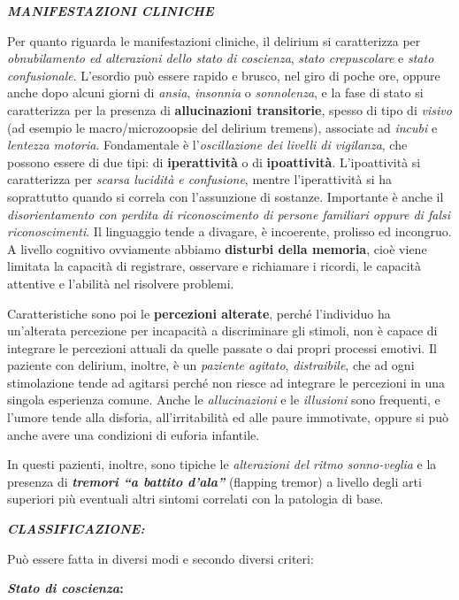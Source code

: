 \documentclass[]{article}
\begin{document}
\textbf{\emph{MANIFESTAZIONI CLINICHE}}

Per quanto riguarda le manifestazioni cliniche, il delirium si
caratterizza per \emph{obnubilamento ed alterazioni dello stato di
coscienza}, \emph{stato crepuscolare} e \emph{stato confusionale}.
L'esordio può essere rapido e brusco, nel giro di poche ore, oppure
anche dopo alcuni giorni di \emph{ansia}, \emph{insonnia} o
\emph{sonnolenza}, e la fase di stato si caratterizza per la presenza di
\textbf{allucinazioni transitorie}, spesso di tipo di \emph{visivo} (ad
esempio le macro/microzoopsie del delirium tremens), associate ad
\emph{incubi} e \emph{lentezza motoria}. Fondamentale è
l'\emph{oscillazione dei livelli di vigilanza}, che possono essere di
due tipi: di \textbf{iperattività} o di \textbf{ipoattività}.
L'ipoattività si caratterizza per \emph{scarsa lucidità e confusione},
mentre l'iperattività si ha soprattutto quando si correla con
l'assunzione di sostanze. Importante è anche il \emph{disorientamento
con perdita di riconoscimento di persone familiari oppure di falsi
riconoscimenti}. Il linguaggio tende a divagare, è incoerente, prolisso
ed incongruo. A livello cognitivo ovviamente abbiamo \textbf{disturbi
della memoria}, cioè viene limitata la capacità di registrare, osservare
e richiamare i ricordi, le capacità attentive e l'abilità nel risolvere
problemi.

Caratteristiche sono poi le \textbf{percezioni alterate}, perché
l'individuo ha un'alterata percezione per incapacità a discriminare gli
stimoli, non è capace di integrare le percezioni attuali da quelle
passate o dai propri processi emotivi. Il paziente con delirium,
inoltre, è un \emph{paziente agitato}, \emph{distraibile}, che ad ogni
stimolazione tende ad agitarsi perché non riesce ad integrare le
percezioni in una singola esperienza comune. Anche le
\emph{allucinazioni} e le \emph{illusioni} sono frequenti, e l'umore
tende alla disforia, all'irritabilità ed alle paure immotivate, oppure
si può anche avere una condizioni di euforia infantile.

In questi pazienti, inoltre, sono tipiche le \emph{alterazioni del ritmo
sonno-veglia} e la presenza di \textbf{\emph{tremori ``a battito
d'ala''}} (flapping tremor) a livello degli arti superiori più eventuali
altri sintomi correlati con la patologia di base.

\textbf{\emph{CLASSIFICAZIONE:}}

Può essere fatta in diversi modi e secondo diversi criteri:

\textbf{\emph{Stato di coscienza}: }
\end{document}
